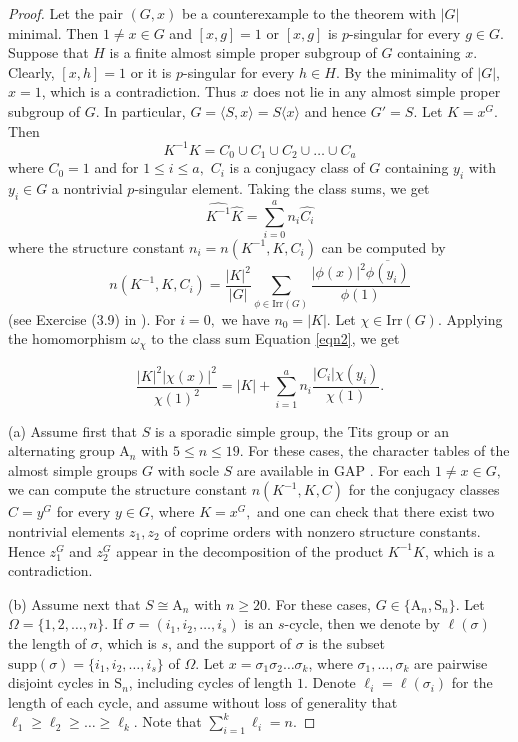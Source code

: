 \documentclass[10pt,a4paper]{amsart}
\newcommand{\AAA}{\mathrm {A}}
\newcommand{\Irr}{\mathrm {Irr}}
\newcommand{\SSS}{\mathrm {S}}
\renewcommand{\geq}{\geqs}
\newcommand{\geqs}{\geqslant}
\newcommand{\la}{\langle}
\renewcommand{\leq}{\leqs}
\newcommand{\leqs}{\leqslant}
\newcommand{\ra}{\rangle}
\newcommand{\supp}{\mathrm {supp}}
\begin{document}
\begin{proof}
Let the pair $(G,x)$ be a counterexample to the theorem with $|G|$ minimal. Then $1\neq x\in G$ and $[x,g]=1$ or  $[x,g]$ is $p$-singular for every $g\in G.$ Suppose that $H$ is a finite almost simple proper subgroup of $G$ containing $x$. Clearly, $[x,h]=1$ or it is $p$-singular for every $h\in H.$  By the minimality of $|G|$, $x=1$, which is a contradiction. Thus $x$ does not lie in any almost simple proper subgroup of $G$. In particular,  $G=\la S,x\ra=S\la x\ra$ and hence $G'=S$. Let $K=x^G.$ Then 
\begin{equation}\label{eqn1} K^{-1}K=C_0\cup C_1\cup C_2\cup\dots\cup C_a
\end{equation} where $C_0=1$ and for $1\leq i\leq a,$  $C_i$ is a conjugacy class of $G$ containing $y_i$ with $y_i\in G$ a nontrivial $p$-singular element. Taking the class sums, we get 
\begin{equation}\label{eqn2}\widehat{K^{-1}}\widehat{K}=\sum_{i=0}^a n_i \widehat{C_i}\end{equation}
 where the structure constant $n_i=n(K^{-1},K,C_i)$ can be computed by \begin{equation}\label{eqn3}n(K^{-1},K,C_i)=\dfrac{|K|^2}{|G|}\sum_{\phi\in\Irr(G)}\dfrac{|\phi(x)|^2\overline{\phi(y_i)}}{\phi(1)}\end{equation} (see Exercise (3.9) in \cite{Isaacs-ct}). For $i=0,$ we have $n_0=|K|.$
Let $\chi\in\Irr(G)$. Applying the homomorphism $\omega_\chi$ to the class sum Equation \eqref{eqn2}, we get

\begin{equation}\label{eqn4}
\dfrac{|K|^2|\chi(x)|^2}{\chi(1)^2}=|K|+\sum_{i=1}^a n_i\dfrac{|C_i|\chi(y_i)}{\chi(1)}.
\end{equation}

(a) Assume first that $S$ is a sporadic simple group, the Tits group or an alternating group $\AAA_n$ with $5\leq n\leq 19$. For these cases, the character tables of the almost simple groups $G$ with socle $S$ are available in GAP \cite{GAP}. For each $1\neq x\in G,$ we can compute the structure constant $n(K^{-1},K,C)$ for the conjugacy classes $C=y^G$ for every $y\in G$, where $K=x^G,$ and one can check that there exist two nontrivial elements $z_1,z_2$ of coprime orders with nonzero structure constants. Hence $z_1^G$ and $z_2^G$ appear in the decomposition of the product $K^{-1}K$, which is a contradiction.

(b) Assume next that $S\cong \AAA_n$ with $n\ge 20.$ For these cases, $G\in \{\AAA_n,\SSS_n\}.$ Let $\Omega=\{1,2,\ldots, n\}$. If $\sigma=(i_1,i_2,\dots,i_s)$ is an $s$-cycle, then we denote by $\ell(\sigma)$ the length of $\sigma$, which is $s$, and the support of $\sigma$ is the subset $\supp(\sigma)=\{i_1,i_2,\ldots,i_s\}$ of $\Omega.$ Let $x=\sigma_1\sigma_2\dots\sigma_k$, where $\sigma_1, \dots,\sigma_k$ are pairwise disjoint  cycles in $\SSS_n$, including cycles of length $1$. Denote $\ell_i=\ell(\sigma_i)$ for the length of each cycle, and assume without loss of generality that  $\ell_1\geq \ell_2\geq\dots\geq \ell_k.$ Note that $\sum_{i=1}^k \ell_i=n.$


\end{proof}
\end{document}
